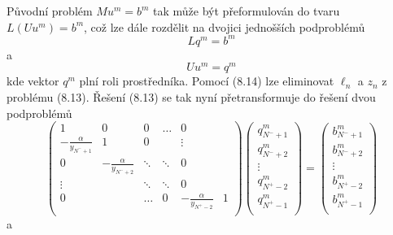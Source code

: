 \documentclass[a4paper]{book}
\begin{document}
Původní problém $Mu^m = b^m$ tak může být přeformulován do tvaru $L(Uu^m) = b^m$, což lze dále rozdělit na dvojici jednošších podproblémů
\begin{equation*}
Lq^m = b^m
\end{equation*}
a
\begin{equation*}
Uu^m = q^m
\end{equation*}
kde vektor $q^m$ plní roli prostředníka. Pomocí (8.14) lze eliminovat $\ell_n$ a $z_n$ z problému (8.13). Řešení (8.13) se tak nyní přetransformuje do řešení dvou podproblémů
\begin{equation}
	\begin{pmatrix}
		1 & 0 & 0 & \dots & 0 \\
		-\frac{\alpha}{y_{N^{-}+1}} & 1 & 0 & & \vdots \\
		0 & -\frac{\alpha}{y_{N^{-}+2}} & \ddots & \ddots & 0 \\
		\vdots & & \ddots & \ddots & 0 \\
		0 & & \dots & 0 & -\frac{\alpha}{y_{N^{+}-2}} & 1 \\
	\end{pmatrix}
	\begin{pmatrix}
		q_{N^{-} + 1}^m \\
		q_{N^{-} + 2}^m \\
		\vdots \\
		q_{N^{+} - 2}^m \\
		q_{N^{+} - 1}^m \\
	\end{pmatrix}
	=
	\begin{pmatrix}
		b_{N^{-} + 1}^m \\
		b_{N^{-} + 2}^m \\
		\vdots \\
		b_{N^{+} - 2}^m \\
		b_{N^{+} - 1}^m \\
	\end{pmatrix}
\end{equation}
a
\end{document}
